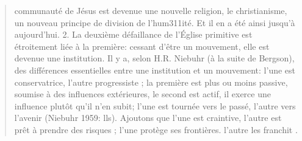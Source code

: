\begin{quote}
communauté de Jésus est devenue une nouvelle religion, le
christianisme, un nouveau principe de division de l'hum311ité. Et il en
a été ainsi jusqu'à aujourd'hui.
2. La deuxième défaillance de l'Église primitive est étroitement liée
à la première: cessant d'être un mouvement, elle est devenue une
institution. Il y a, selon H.R. Niebuhr (à la suite de Bergson), des
différences essentielles entre une institution et un mouvement: l'une
est conservatrice, l'autre progressiste ; la première est plus ou moins
passive, soumise à des influences extérieures, le second est actif, il
exerce une influence plutôt qu'il n'en subit; l'une est tournée vers le
passé, l'autre vers l'avenir (Niebuhr 1959: lls). Ajoutons que l'une
est craintive, l'autre est prêt à prendre des risques ; l'une protège ses
frontières. l'autre les franchit .
\end{quote}

